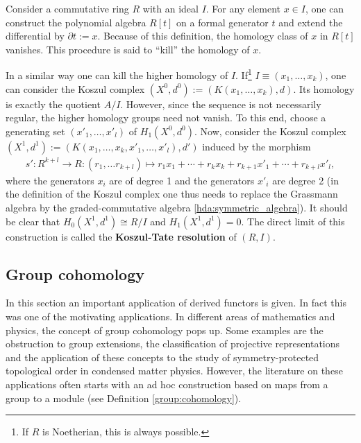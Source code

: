     \begin{property}\label{homalg:koszul_tate_resolution}
        Consider a commutative ring $R$ with an ideal $I$. For any element $x\in I$, one can construct the polynomial algebra $R[t]$ on a formal generator $t$ and extend the differential by $\partial t:=x$. Because of this definition, the homology class of $x$ in $R[t]$ vanishes. This procedure is said to ``kill'' the homology of $x$.

        In a similar way one can kill the higher homology of $I$. If\footnote{If $R$ is Noetherian, this is always possible.} $I\equiv(x_1,\ldots,x_k)$, one can consider the Koszul complex $(X^0,d^0):=(K(x_1,\ldots,x_k),d)$. Its homology is exactly the quotient $A/I$. However, since the sequence is not necessarily regular, the higher homology groups need not vanish. To this end, choose a generating set $(x'_1,\ldots,x'_l)$ of $H_1(X^0,d^0)$. Now, consider the Koszul complex $(X^1,d^1):=(K(x_1,\ldots,x_k,x'_1,\ldots,x'_l),d')$ induced by the morphism
        \begin{gather}
            s':R^{k+l}\rightarrow R:(r_1,\ldots r_{k+l})\mapsto r_1x_1+\cdots+r_kx_k+r_{k+1}x'_1+\cdots+r_{k+l}x'_l,
        \end{gather}
        where the generators $x_i$ are of degree 1 and the generators $x'_i$ are degree 2 (in the definition of the Koszul complex one thus needs to replace the Grassmann algebra by the graded-commutative algebra \ref{hda:symmetric_algebra}). It should be clear that $H_0(X^1,d^1)\cong R/I$ and $H_1(X^1,d^1)=0$. The direct limit of this construction is called the \textbf{Koszul-Tate resolution} of $(R,I)$.
    \end{property}

\subsection{Group cohomology}\label{section:group_cohomology}

	In this section an important application of derived functors is given. In fact this was one of the motivating applications. In different areas of mathematics and physics, the concept of group cohomology pops up. Some examples are the obstruction to group extensions, the classification of projective representations and the application of these concepts to the study of symmetry-protected topological order in condensed matter physics. However, the literature on these applications often starts with an ad hoc construction based on maps from a group to a module (see Definition \ref{group:cohomology}).

